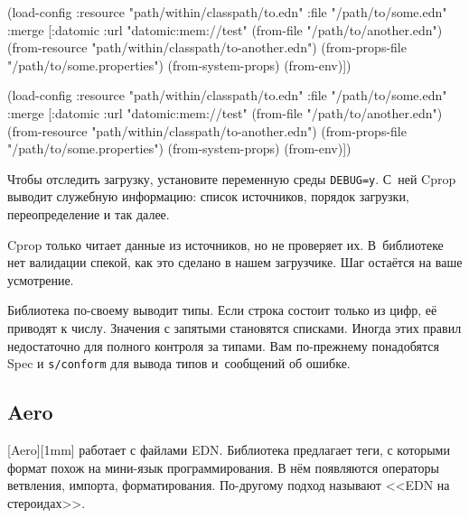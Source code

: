 \ifx\devicetype\mobile

\begin{english}
  \begin{clojure}
(load-config
 :resource "path/within/classpath/to.edn"
 :file "/path/to/some.edn"
 :merge
 [{:datomic {:url "datomic:mem://test"}}
  (from-file "/path/to/another.edn")
  (from-resource
  "path/within/classpath/to-another.edn")
  (from-props-file
   "/path/to/some.properties")
  (from-system-props)
  (from-env)])
  \end{clojure}
\end{english}

\else

\begin{english}
  \begin{clojure}
(load-config
 :resource "path/within/classpath/to.edn"
 :file "/path/to/some.edn"
 :merge [{:datomic {:url "datomic:mem://test"}}
         (from-file "/path/to/another.edn")
         (from-resource "path/within/classpath/to-another.edn")
         (from-props-file "/path/to/some.properties")
         (from-system-props)
         (from-env)])
  \end{clojure}
\end{english}

\fi

Чтобы отследить загрузку, установите переменную среды \verb|DEBUG=y|. С~ней
Cprop выводит служебную информацию: список источников, порядок загрузки,
переопределение и так далее.

Cprop только читает данные из источников, но не проверяет их. В~библиотеке нет
валидации спекой, как это сделано в нашем загрузчике. Шаг остаётся на ваше
усмотрение.

Библиотека по-своему выводит типы. Если строка состоит только из цифр, её
приводят к числу. Значения с запятыми становятся списками. Иногда этих правил
недостаточно для полного контроля за типами. Вам по-прежнему понадобятся
Spec и \verb|s/conform| для вывода типов и~сообщений об ошибке.

\subsection{Aero}


[Aero][1mm] работает с файлами
EDN. Библиотека предлагает теги, с которыми формат похож на мини-язык
программирования. В нём появляются операторы ветвления, импорта,
форматирования. По-другому подход называют <<EDN на стероидах>>.

